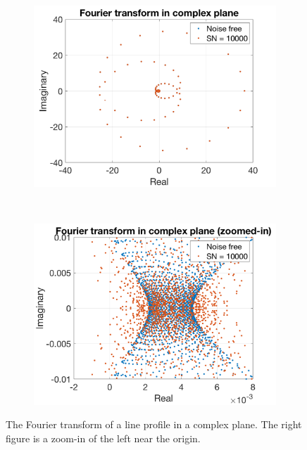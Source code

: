 \begin{figure}[tbp]	
    \begin{subfigure}[b]{0.49\textwidth}
        \includegraphics[width=\textwidth]{./Figures/Methods/7-Phase_angle_in_complex_plane_1.png}
        \label{fig:FT_compelx_plane_1}
    \end{subfigure}
	~
    \begin{subfigure}[b]{0.49\textwidth}
        \includegraphics[width=\textwidth]{./Figures/Methods/7-Phase_angle_in_complex_plane_2.png}
        \label{fig:FT_compelx_plane_2}
    \end{subfigure}	
    
    \caption[Fourier transform of a line profile in a complex plane]
    {The Fourier transform of a line profile in a complex plane. The right figure is a zoom-in of the left near the origin.}
\label{fig:FT_compelx_plane}
\end{figure}    
\FloatBarrier


